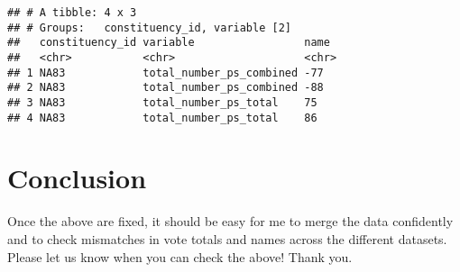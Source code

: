 \documentclass[]{article}
\begin{document}
\begin{verbatim}
## # A tibble: 4 x 3
## # Groups:   constituency_id, variable [2]
##   constituency_id variable                 name 
##   <chr>           <chr>                    <chr>
## 1 NA83            total_number_ps_combined -77  
## 2 NA83            total_number_ps_combined -88  
## 3 NA83            total_number_ps_total    75   
## 4 NA83            total_number_ps_total    86
\end{verbatim}

\hypertarget{conclusion}{%
\section{Conclusion}\label{conclusion}}

Once the above are fixed, it should be easy for me to merge the data
confidently and to check mismatches in vote totals and names across the
different datasets. Please let us know when you can check the above!
Thank you.
\end{document}
